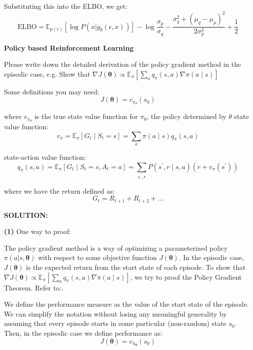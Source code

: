 \documentclass{homework}
\begin{document}
Substituting this into the ELBO, we get:
$$
\mathrm{ELBO}=\mathbb{E}_{p(\epsilon)}[\log P(x | g_{\theta}(\epsilon, x))]- \log \frac{\sigma_p}{\sigma_q} - \frac{\sigma_q^2 + (\mu_q - \mu_p)^2}{2\sigma_p^2} + \frac{1}{2}
$$

\begin{shaded}
\question\textbf{Policy based Reinforcement Learning}

Please write down the detailed derivation of the policy gradient method in the episodic case, e.g. Show that $\nabla J(\boldsymbol{\theta}) \propto \mathbb{E}_{\pi}\left[\sum_{a} q_{\pi}(s, a) \nabla \pi(a \mid s)\right]$

Some definitions you may need:
$$
J(\boldsymbol{\theta})=v_{\pi_{\theta}}\left(s_{0}\right)
$$

where $v_{\pi_{\theta}}$ is the true state value function for $\pi_{\theta}$, the policy determined by $\theta$ state value function:
$$
v_{\pi}=\mathbb{E}_{\pi}\left[G_{t} \mid S_{t}=s\right]=\sum_{a} \pi(a \mid s) q_{\pi}(s, a)
$$

state-action value function:
$$
q_{\pi}(s, a)=\mathbb{E}_{\pi}\left[G_{t} \mid S_{t}=s, A_{t}=a\right]=\sum_{s^{\prime}, r} P\left(s^{\prime}, r \mid s, a\right)\left(r+v_{\pi}\left(s^{\prime}\right)\right)
$$

where we have the return defined as:
$$
G_{t}=R_{t+1}+R_{t+2}+\ldots
$$

\end{shaded}

\textbf{SOLUTION:}

\textbf{(1)} One way to proof:

The policy gradient method is a way of optimizing a parameterized policy $\pi(a | s, \boldsymbol{\theta})$ with respect to some objective function $J(\boldsymbol{\theta})$. In the episodic case, $J(\boldsymbol{\theta})$ is the expected return from the start state of each episode. To show that $\nabla J(\boldsymbol{\theta}) \propto \mathbb{E}_{\pi}\left[\sum_{a} q_{\pi}(s, a) \nabla \pi(a \mid s)\right]$, we try to proof the Policy Gradient Theorem. Refer to:\cite{weng_policy_2018,richard_s_sutton_reinforcement_2022}.

We define the performance measure as the value of the start state of the episode. We can simplify the notation without losing any meaningful generality by assuming that every episode starts in some particular (non-random) state $s_{0}$. Then, in the episodic case we define performance as:
$$
J(\boldsymbol{\theta}) = v_{\pi_{\boldsymbol{\theta}}}\left(s_{0}\right)
$$
\end{document}
